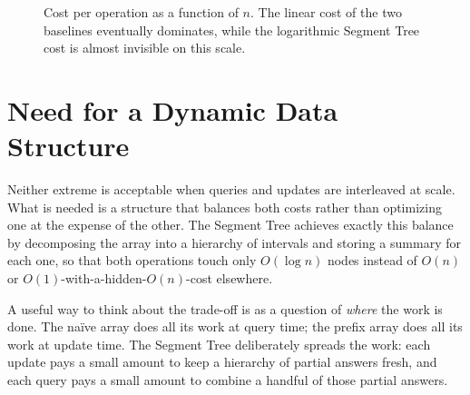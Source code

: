 \documentclass[
  11pt,
  a4paper,
  twoside=false,
  numbers=noenddot,
  headings=big,
  parskip=half,
  toc=bibliography,
  toc=listof,
  bibliography=totoc
]{scrreprt}
\begin{document}
\begin{figure}[h]
\centering
{}
\caption{Cost per operation as a function of $n$. The linear cost of the two baselines eventually dominates, while the logarithmic Segment Tree cost is almost invisible on this scale.}
\label{fig:tradeoffplot}
\end{figure}

\section{Need for a Dynamic Data Structure}
Neither extreme is acceptable when queries and updates are interleaved at scale. What is needed is a structure that balances both costs rather than optimizing one at the expense of the other. The Segment Tree achieves exactly this balance by decomposing the array into a hierarchy of intervals and storing a summary for each one, so that both operations touch only $O(\log n)$ nodes instead of $O(n)$ or $O(1)$-with-a-hidden-$O(n)$-cost elsewhere.

\begin{remark}
A useful way to think about the trade-off is as a question of \emph{where} the work is done. The na\"ive array does all its work at query time; the prefix array does all its work at update time. The Segment Tree deliberately spreads the work: each update pays a small amount to keep a hierarchy of partial answers fresh, and each query pays a small amount to combine a handful of those partial answers.
\end{remark}

\end{document}
